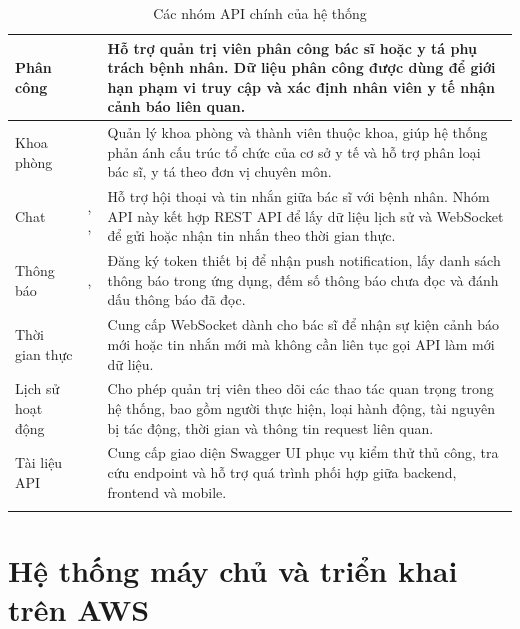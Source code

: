 \begin{center}
\begin{longtable}{|L{3.0cm}|L{5.8cm}|L{6.4cm}|}
    Phân công &
     &
    Hỗ trợ quản trị viên phân công bác sĩ hoặc y tá phụ trách bệnh nhân. Dữ liệu phân công được dùng để giới hạn phạm vi truy cập và xác định nhân viên y tế nhận cảnh báo liên quan. \\
    \hline

    Khoa phòng &
     &
    Quản lý khoa phòng và thành viên thuộc khoa, giúp hệ thống phản ánh cấu trúc tổ chức của cơ sở y tế và hỗ trợ phân loại bác sĩ, y tá theo đơn vị chuyên môn. \\
    \hline

    Chat &
    , ,  &
    Hỗ trợ hội thoại và tin nhắn giữa bác sĩ với bệnh nhân. Nhóm API này kết hợp REST API để lấy dữ liệu lịch sử và WebSocket để gửi hoặc nhận tin nhắn theo thời gian thực. \\
    \hline

    Thông báo &
    ,  &
    Đăng ký token thiết bị để nhận push notification, lấy danh sách thông báo trong ứng dụng, đếm số thông báo chưa đọc và đánh dấu thông báo đã đọc. \\
    \hline

    Thời gian thực &
     &
    Cung cấp WebSocket dành cho bác sĩ để nhận sự kiện cảnh báo mới hoặc tin nhắn mới mà không cần liên tục gọi API làm mới dữ liệu. \\
    \hline

    Lịch sử hoạt động &
     &
    Cho phép quản trị viên theo dõi các thao tác quan trọng trong hệ thống, bao gồm người thực hiện, loại hành động, tài nguyên bị tác động, thời gian và thông tin request liên quan. \\
    \hline

    Tài liệu API &
     &
    Cung cấp giao diện Swagger UI phục vụ kiểm thử thủ công, tra cứu endpoint và hỗ trợ quá trình phối hợp giữa backend, frontend và mobile. \\
    \hline

    \caption{Các nhóm API chính của hệ thống}
    \label{chapter3-table01}
\end{longtable}
\normalsize
\end{center}

\section{Hệ thống máy chủ và triển khai trên AWS}

